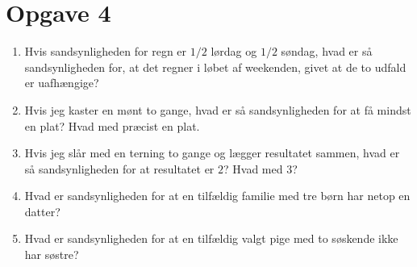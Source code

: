 \section*{Opgave 4}
\begin{enumerate}[label=\roman*)]
\item Hvis sandsynligheden for regn er $1/2$ lørdag og $1/2$ søndag, hvad er så sandsynligheden for, at det regner i løbet af weekenden, givet at de to udfald er uafhængige?
\item Hvis jeg kaster en mønt to gange, hvad er så sandsynligheden for at få mindst en plat? Hvad med præcist en plat.
\item Hvis jeg slår med en terning to gange og lægger resultatet sammen, hvad er så sandsynligheden for at resultatet er $2$? Hvad med $3$?
\item Hvad er sandsynligheden for at en tilfældig familie med tre børn har netop en datter?
\item Hvad er sandsynligheden for at en tilfældig valgt pige med to søskende ikke har søstre?
\end{enumerate}
